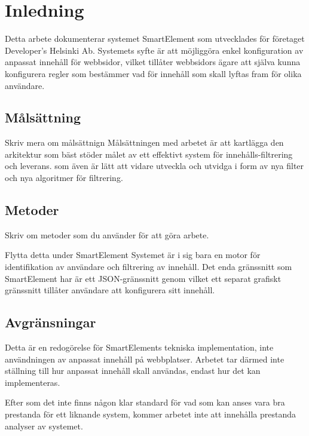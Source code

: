 \section{Inledning}

Detta arbete dokumenterar systemet SmartElement som utvecklades för företaget Developer’s Helsinki Ab. Systemets syfte är att möjliggöra enkel konfiguration av anpassat innehåll för webbsidor, vilket tillåter webbsidors ägare att själva kunna konfigurera regler som bestämmer vad för innehåll som skall lyftas fram för olika användare.

\subsection{Målsättning}

Skriv mera om målsättnign
Målsättningen med arbetet är att kartlägga den arkitektur som bäst stöder målet av ett effektivt system för innehålls-filtrering och leverans. som även är lätt att vidare utveckla och utvidga i form av nya filter och nya algoritmer för filtrering.

\subsection{Metoder}

Skriv om metoder som du använder för att göra arbete.

Flytta detta under SmartElement
Systemet är i sig bara en motor för identifikation av användare och filtrering av innehåll. Det enda gränssnitt som SmartElement har är ett JSON-gränssnitt genom vilket ett separat grafiskt gränssnitt tillåter användare att konfigurera sitt innehåll.

\subsection{Avgränsningar}

Detta är en redogörelse för SmartElements tekniska implementation, inte användningen av anpassat innehåll på webbplatser. Arbetet tar därmed inte ställning till hur anpassat innehåll skall användas, endast hur det kan implementeras.

Efter som det inte finns någon klar standard för vad som kan anses vara bra prestanda för ett liknande system, kommer arbetet inte att innehålla prestanda analyser av systemet.

